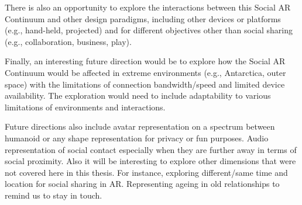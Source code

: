There is also an opportunity to explore the interactions between this Social AR Continuum and other design paradigms, including other devices or platforms (e.g., hand-held, projected) and for different objectives other than social sharing (e.g., collaboration, business, play).

Finally, an interesting future direction would be to explore how the Social AR Continuum would be affected in extreme environments (e.g., Antarctica, outer space) with the limitations of connection bandwidth/speed and limited device availability. The exploration would need to include adaptability to various limitations of environments and interactions. 

Future directions also include avatar representation on a spectrum between humanoid or any shape representation for privacy or fun purposes. Audio representation of social contact especially when they are further away in terms of social proximity. Also it will be interesting to explore other dimensions that were not covered here in this thesis. For instance, exploring different/same time and location for social sharing in AR. Representing ageing in old relationships to remind us to stay in touch. 
